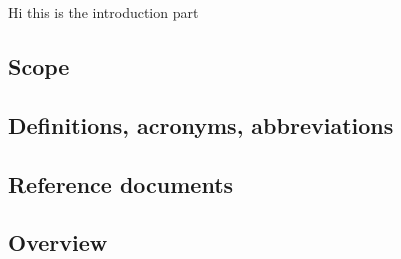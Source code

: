 Hi this is the introduction part
\subsection{Scope}
\subsection{Definitions, acronyms, abbreviations}
\subsection{Reference documents}
\subsection{Overview}
